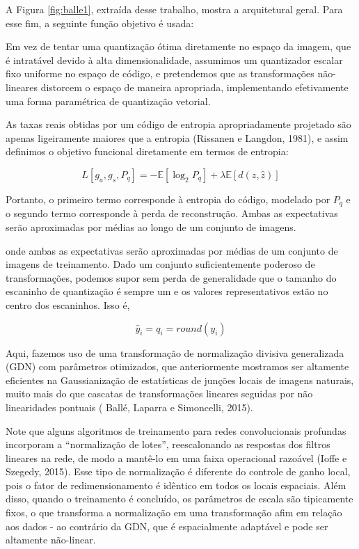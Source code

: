 A Figura \ref{fig:balle1}, extraída desse trabalho, mostra a arquitetural geral. Para esse fim, a seguinte função objetivo é usada:


Em vez de tentar uma quantização ótima diretamente no espaço da imagem, que é intratável devido à alta dimensionalidade, assumimos um quantizador escalar fixo uniforme no espaço de código, e pretendemos que as transformações não-lineares distorcem o espaço de maneira apropriada, implementando efetivamente uma forma paramétrica de quantização vetorial.

As taxas reais obtidas por um código de entropia apropriadamente projetado são apenas ligeiramente maiores que a entropia (Rissanen e Langdon, 1981), e assim definimos o objetivo funcional diretamente em termos de entropia:

\begin{equation}
L[g_a, g_s, P_q] = - \mathbb{E}[\log_2 P_q] + \lambda \mathbb{E}[d(z, \hat{z})]
\end{equation}

Portanto, o primeiro termo corresponde à entropia do código, modelado por $P_q$ e o segundo termo corresponde à perda de reconstrução. Ambas as expectativas serão aproximadas por médias ao longo de um conjunto de imagens. 

onde ambas as expectativas serão aproximadas por médias de um conjunto de imagens de treinamento. Dado um conjunto suficientemente poderoso de transformações, podemos supor sem perda de generalidade que o tamanho do escaninho de quantização é sempre um e os valores representativos estão no centro dos escaninhos. Isso é,

\begin{equation}
\hat{y}_i = q_i = round(y_i)
\end{equation}









Aqui, fazemos uso de uma transformação de normalização divisiva generalizada (GDN) com parâmetros otimizados, que anteriormente mostramos ser altamente eficientes na Gaussianização de estatísticas de junções locais de imagens naturais, muito mais do que cascatas de transformações lineares seguidas por não linearidades pontuais ( Ballé, Laparra e Simoncelli, 2015).



Note que alguns algoritmos de treinamento para redes convolucionais profundas incorporam a “normalização de lotes”, reescalonando as respostas dos filtros lineares na rede, de modo a mantê-lo em uma faixa operacional razoável (Ioffe e Szegedy, 2015). Esse tipo de normalização é diferente do controle de ganho local, pois o fator de redimensionamento é idêntico em todos os locais espaciais. Além disso, quando o treinamento é concluído, os parâmetros de escala são tipicamente fixos, o que transforma a normalização em uma transformação afim em relação aos dados - ao contrário da GDN, que é espacialmente adaptável e pode ser altamente não-linear.




